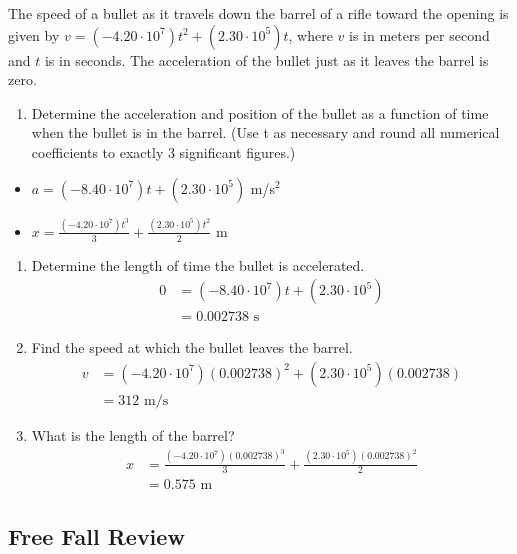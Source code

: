 \documentclass[
  letterpaper,
  DIV=11,
  numbers=noendperiod]{scrartcl}
\providecommand{\tightlist}{%
  \setlength{\itemsep}{0pt}\setlength{\parskip}{0pt}}\usepackage{longtable,booktabs,array}
\begin{document}
The speed of a bullet as it travels down the barrel of a rifle toward
the opening is given by
\(v = (-4.20 \cdot 10^7) t^2 + (2.30 \cdot 10^5) t\), where \(v\) is in
meters per second and \(t\) is in seconds. The acceleration of the
bullet just as it leaves the barrel is zero.

\begin{enumerate}
\def\labelenumi{(\alph{enumi})}
\tightlist
\item
  Determine the acceleration and position of the bullet as a function of
  time when the bullet is in the barrel. (Use t as necessary and round
  all numerical coefficients to exactly 3 significant figures.)
\end{enumerate}

\begin{itemize}
\tightlist
\item
  \(a = \left(-8.40\cdot 10^7\right)t+\left(2.30\cdot 10^5\right)\)
  m/s\(^2\)
\item
  \(x = \frac{\left(-4.20\cdot 10^7\right)t^3}{3}+\frac{\left(2.30\cdot 10^5\right)t^2}{2}\)
  m
\end{itemize}

\begin{enumerate}
\def\labelenumi{(\alph{enumi})}
\setcounter{enumi}{1}
\item
  Determine the length of time the bullet is accelerated. \begin{align*}
  0 &= \left(-8.40\cdot 10^7\right)t+\left(2.30\cdot 10^5\right) \\
    &= 0.002738 \text{ s}
  \end{align*}
\item
  Find the speed at which the bullet leaves the barrel. \begin{align*}
  v &= \left(-4.20\cdot 10^7\right)(0.002738)^2+\left(2.30\cdot 10^5\right)(0.002738) \\
  &= 312 \text{ m/s}
  \end{align*}
\item
  What is the length of the barrel? \begin{align*}
  x &= \frac{\left(-4.20\cdot 10^7\right)(0.002738)^3}{3}+\frac{\left(2.30\cdot 10^5\right)(0.002738)^2}{2} \\
  &= 0.575 \text{ m}
  \end{align*}
\end{enumerate}

\hypertarget{free-fall-review}{%
\subsection{Free Fall Review}\label{free-fall-review}}
\end{document}
